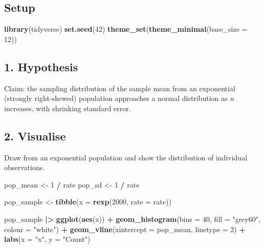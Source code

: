 \documentclass[
]{article}
\newenvironment{Shaded}{\begin{snugshade}}{\end{snugshade}}
\newcommand{\AttributeTok}[1]{\textcolor[rgb]{0.13,0.29,0.53}{#1}}
\newcommand{\DecValTok}[1]{\textcolor[rgb]{0.00,0.00,0.81}{#1}}
\newcommand{\FunctionTok}[1]{\textcolor[rgb]{0.13,0.29,0.53}{\textbf{#1}}}
\newcommand{\NormalTok}[1]{#1}
\newcommand{\OtherTok}[1]{\textcolor[rgb]{0.56,0.35,0.01}{#1}}
\newcommand{\SpecialCharTok}[1]{\textcolor[rgb]{0.81,0.36,0.00}{\textbf{#1}}}
\newcommand{\StringTok}[1]{\textcolor[rgb]{0.31,0.60,0.02}{#1}}
\begin{document}
\subsection{Setup}\label{setup}

\begin{Shaded}
\begin{Highlighting}[]
\FunctionTok{library}\NormalTok{(tidyverse)}
\FunctionTok{set.seed}\NormalTok{(}\DecValTok{42}\NormalTok{)}
\FunctionTok{theme\_set}\NormalTok{(}\FunctionTok{theme\_minimal}\NormalTok{(}\AttributeTok{base\_size =} \DecValTok{12}\NormalTok{))}
\end{Highlighting}
\end{Shaded}

\subsection{1. Hypothesis}\label{hypothesis}

Claim: the sampling distribution of the sample mean from an exponential
(strongly right-skewed) population approaches a normal distribution as
\emph{n} increases, with shrinking standard error.

\subsection{2. Visualise}\label{visualise}

Draw from an exponential population and show the distribution of
individual observations.

\begin{Shaded}
\begin{Highlighting}[]
\NormalTok{pop\_mean }\OtherTok{\textless{}{-}} \DecValTok{1} \SpecialCharTok{/}\NormalTok{ rate}
\NormalTok{pop\_sd   }\OtherTok{\textless{}{-}} \DecValTok{1} \SpecialCharTok{/}\NormalTok{ rate}

\NormalTok{pop\_sample }\OtherTok{\textless{}{-}} \FunctionTok{tibble}\NormalTok{(}\AttributeTok{x =} \FunctionTok{rexp}\NormalTok{(}\DecValTok{2000}\NormalTok{, }\AttributeTok{rate =}\NormalTok{ rate))}
\end{Highlighting}
\end{Shaded}

\begin{Shaded}
\begin{Highlighting}[]
\NormalTok{pop\_sample }\SpecialCharTok{|\textgreater{}}
  \FunctionTok{ggplot}\NormalTok{(}\FunctionTok{aes}\NormalTok{(x)) }\SpecialCharTok{+}
  \FunctionTok{geom\_histogram}\NormalTok{(}\AttributeTok{bins =} \DecValTok{40}\NormalTok{, }\AttributeTok{fill =} \StringTok{"grey60"}\NormalTok{, }\AttributeTok{colour =} \StringTok{"white"}\NormalTok{) }\SpecialCharTok{+}
  \FunctionTok{geom\_vline}\NormalTok{(}\AttributeTok{xintercept =}\NormalTok{ pop\_mean, }\AttributeTok{linetype =} \DecValTok{2}\NormalTok{) }\SpecialCharTok{+}
  \FunctionTok{labs}\NormalTok{(}\AttributeTok{x =} \StringTok{"x"}\NormalTok{, }\AttributeTok{y =} \StringTok{"Count"}\NormalTok{)}
\end{Highlighting}
\end{Shaded}
\end{document}
